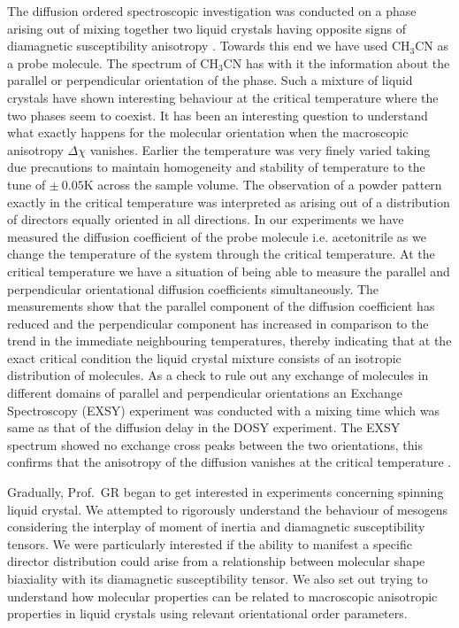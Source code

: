 The diffusion ordered spectroscopic investigation was conducted on a phase
arising out of mixing together two liquid crystals having opposite signs of
diamagnetic susceptibility anisotropy \cite{chap31-key15}. Towards this end we have used
CH$_3$CN as a probe molecule. The spectrum of CH$_3$CN has with it the information
about the parallel or perpendicular orientation of the phase. Such a mixture of
liquid crystals have shown interesting behaviour at the critical temperature where
the two phases seem to coexist. It has been an interesting question to understand
what exactly happens for the molecular orientation when the macroscopic
anisotropy $\Delta \chi$ vanishes. Earlier the temperature was very finely varied taking due
precautions to maintain homogeneity and stability of temperature to the tune of
$\pm~ 0.05$K across the sample volume. The observation of a powder pattern exactly
in the critical temperature was interpreted as arising out of a distribution of
directors equally oriented in all directions. In our experiments we have measured
the diffusion coefficient of the probe molecule i.e. acetonitrile as we change the
temperature of the system through the critical temperature. At the critical
temperature we have a situation of being able to measure the parallel and
perpendicular orientational diffusion coefficients simultaneously. The
measurements show that the parallel component of the diffusion coefficient has
reduced and the perpendicular component has increased in comparison to the
trend in the immediate neighbouring temperatures, thereby indicating that at the
exact critical condition the liquid crystal mixture consists of an isotropic
distribution of molecules. As a check to rule out any exchange of molecules in
different domains of parallel and perpendicular orientations an Exchange
Spectroscopy (EXSY) experiment was conducted with a mixing time which was
same as that of the diffusion delay in the DOSY experiment. The EXSY spectrum
showed no exchange cross peaks between the two orientations, this confirms that
the anisotropy of the diffusion vanishes at the critical temperature \cite{chap31-key16}.

Gradually, Prof.\ GR began to get interested in experiments concerning spinning
liquid crystal. We attempted to rigorously understand the behaviour of mesogens
considering the interplay of moment of inertia and diamagnetic susceptibility
tensors. We were particularly interested if the ability to manifest a specific
director distribution could arise from a relationship between molecular shape
biaxiality with its diamagnetic susceptibility tensor. We also set out trying to
understand how molecular properties can be related to macroscopic anisotropic
properties in liquid crystals using relevant orientational order parameters.

